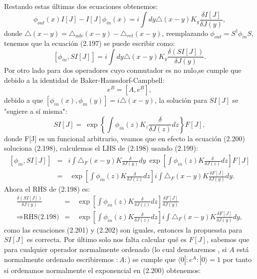 Restando estas últimas dos ecuaciones obtenemos:
\begin{equation}
\phi_{out}(x)I[J]-I[J]\phi_{in}(x)=i\int dy\triangle(x-y)K_y\frac{\delta I[J]}{\delta J(y)},
\end{equation}
donde $\triangle(x-y)=\triangle_{adv}(x-y)-\triangle_{ret}(x-y)$, reemplazando $\phi_{out}=S^{\dagger}\phi_{in}S$, tenemos que la ecuación (2.197) se puede escribir como:
\begin{equation}
\left[\phi_{in},SI[J]\right]=i\int dy\triangle(x-y)K_{y}\frac{\delta (SI[J])}{\delta J(y)}.
\end{equation}
Por otro lado para dos operadores cuyo conmutador es no nulo,se cumple que debido a la identidad de Baker-Haussdorf-Campbell:
\begin{equation}
[A,B]e^B=[A,e^B],
\end{equation} 
debido a que $[\phi_{in}(x),\phi_{in}(y)]=i\triangle(x-y)$, la solución para $SI[J]$ se "sugiere a sí misma":
\begin{equation}
SI[J]=\ \exp\left\{ \int\phi_{in}(z)K_{z}\frac{\delta}{\delta J(z)}dz\right\} F[J],
\end{equation}
donde F[J] es un funcional arbitrario, veamos que en efecto la ecuación (2.200) soluciona (2.198), calculemos el LHS de (2.198) usando (2.199):
\begin{eqnarray}
\nonumber \left[\phi_{in},SI[J]\right]&=&i\int\triangle_{F}(x-y)K\frac{\delta}{\delta J(y)}dy\ \exp\left[\int\phi_{in}(z)K\frac{\delta}{\delta J(z)}dz\right]F[J]\\
&=&\ \exp\left[\int\phi_{in}(z)K\frac{\delta}{\delta J(z)}dz\right]i\int\triangle_{F}(x-y)K\frac{\delta F[J]}{\delta J(y)}dy .
\end{eqnarray}
Ahora el RHS de (2.198) es:
\begin{eqnarray}
\nonumber \frac{\delta(SI[J])}{\delta J(y)}&=&\ \exp\left[\int\phi_{in}(z)K\frac{\delta}{\delta J(z)}dz\right]\frac{\delta F[J]}{\delta J(y)}\\
\Rightarrow \text{RHS(2.198)}&=& \ \exp\left[\int\phi_{in}(z)K\frac{\delta}{\delta J(z)}dz\right]i\int\triangle_{F}(x-y)K\frac{\delta F[J]}{\delta J(y)}dy ,
\end{eqnarray}
como las ecuaciones (2.201) y (2.202) son iguales, entonces la propuessta para $SI[J]$ es correcta. Por último solo nos falta calcular qué es $F[J]$, sabemos que para cualquier operador normalmente ordenado (lo cual denotaremos , si $A$ está normalmente ordenado escribiremos $:A:$) se cumple que $\langle 0|:e^A:|0\rangle=1$ por tanto si ordenamos normalmente el exponencial en (2.200) obtenemos:

